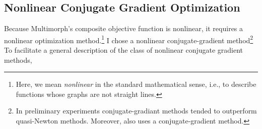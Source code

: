 \subsection{Nonlinear Conjugate Gradient Optimization}
\label{sec:ncg-gen}
Because Multimorph's composite objective function is nonlinear, it requires a nonlinear optimization method.\footnote{Here, we mean \emph{nonlinear} in the standard mathematical sense, i.e., to describe functions whose graphs are not straight lines.} I chose a nonlinear conjugate-gradient method\footnote{In preliminary experiments conjugate-gradiant methods tended to outperform quasi-Newton methods. Moreover, \citet{saund:94} also uses a conjugate-gradient method.} 
%
To facilitate a general description of the class of nonlinear conjugate gradient methods, 
